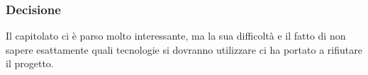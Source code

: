 \subsubsection{Decisione}
Il capitolato ci è parso molto interessante, ma la sua difficoltà e il fatto di non sapere esattamente quali tecnologie si dovranno utilizzare ci ha portato a rifiutare il progetto.
